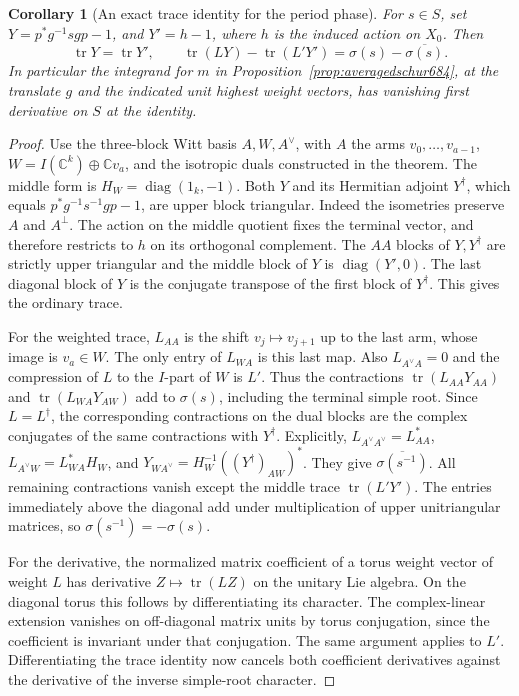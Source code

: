 \documentclass[a4paper,11pt]{article}
\newtheorem{corollary}[proposition]{Corollary}
\theoremstyle{definition}
\theoremstyle{remark}
\numberwithin{equation}{section}
\begin{document}
\begin{corollary}[An exact trace identity for the period phase]\leavevmode
\label{cor:exactphase695}
For \(s\in S\), set \(Y=p^*g^{-1}sgp-1\),
and \(Y'=h-1\), where \(h\) is the induced action on \(X_0\).
Then
\[
  \operatorname{tr}Y=\operatorname{tr}Y',\qquad
  \operatorname{tr}(LY)-\operatorname{tr}(L'Y')
        =\sigma(s)-\overline{\sigma(s)} .
\]
In particular the integrand for \(m\) in
Proposition~\ref{prop:averagedschur684}, at the translate
\(g\) and the indicated unit highest weight vectors, has
vanishing first derivative on \(S\) at the identity.
\end{corollary}
\begin{proof}
Use the three-block Witt basis \(A,W,A^\vee\), with \(A\)
the arms \(v_0,\ldots,v_{a-1}\), \(W=I(\mathbb C^k)
\oplus\mathbb Cv_a\), and the isotropic duals constructed
in the theorem. The middle form is \(H_W=\operatorname{diag}(1_k,-1)\).
Both \(Y\) and its Hermitian adjoint \(Y^\dagger\), which equals
\(p^*g^{-1}s^{-1}gp-1\), are upper block triangular. Indeed
the isometries preserve \(A\) and \(A^\perp\). The action on
the middle quotient fixes the terminal vector, and therefore
restricts to \(h\) on its orthogonal complement. The \(AA\)
blocks of \(Y,Y^\dagger\) are strictly upper triangular and the
middle block of \(Y\) is \(\operatorname{diag}(Y',0)\). The
last diagonal block of \(Y\) is the conjugate transpose of
the first block of \(Y^\dagger\). This gives the ordinary trace.

For the weighted trace, \(L_{AA}\) is the shift \(v_j\mapsto
v_{j+1}\) up to the last arm, whose image is \(v_a\in W\).
The only entry of \(L_{WA}\) is this last map. Also
\(L_{A^\vee A}=0\) and the compression of \(L\) to the
\(I\)-part of \(W\) is \(L'\). Thus the contractions
\(\operatorname{tr}(L_{AA}Y_{AA})\) and
\(\operatorname{tr}(L_{WA}Y_{AW})\) add to \(\sigma(s)\),
including the terminal simple root. Since \(L=L^\dagger\),
the corresponding contractions on the dual blocks are the
complex conjugates of the same contractions with \(Y^\dagger\).
Explicitly,
\(L_{A^\vee A^\vee}=L_{AA}^*\),
\(L_{A^\vee W}=L_{WA}^*H_W\), and
\(Y_{WA^\vee}=H_W^{-1}((Y^\dagger)_{AW})^*\).
They give \(\overline{\sigma(s^{-1})}\).
All remaining contractions vanish except the middle trace
\(\operatorname{tr}(L'Y')\). The entries immediately above the
diagonal add under multiplication of upper unitriangular
matrices, so \(\sigma(s^{-1})=-\sigma(s)\).

For the derivative, the normalized matrix coefficient of a
torus weight vector of weight \(L\) has derivative
\(Z\mapsto\operatorname{tr}(LZ)\) on the unitary Lie algebra.
On the diagonal torus this follows by differentiating its
character. The complex-linear extension vanishes on
off-diagonal matrix units by torus conjugation, since the
coefficient is invariant under that conjugation. The same
argument applies to \(L'\). Differentiating the trace identity
now cancels both coefficient derivatives against the derivative
of the inverse simple-root character.
\end{proof}
\end{document}

